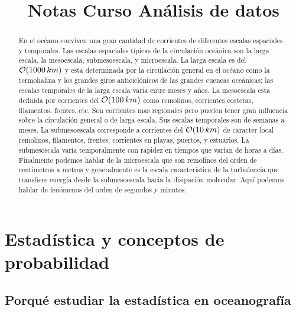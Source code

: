 \documentclass[
]{agujournal2019}
\begin{document}
\title{Notas Curso Análisis de datos}




\begin{abstract}
En el océano conviven una gran cantidad de corrientes de diferentes
escalas espaciales y temporales. Las escalas espaciales típicas de la
circulación oceánica son la larga escala, la mesoescala, submesoescala,
y microescala. La larga escala es del \({\cal O}(1000\,km)\) y esta
determinada por la circulación general en el océano como la termohalina
y los grandes giros anticiclónicos de las grandes cuencas oceánicas; las
escalas temporales de la larga escala varia entre meses y años. La
mesoescala esta definida por corrientes del \({\cal O}(100\,km)\) como
remolinos, corrientes costeras, filamentos, frentes, etc. Son corrientes
mas regionales pero pueden tener gran influencia sobre la circulación
general o de larga escala. Sus escalas temporales son de semanas a
meses. La submesoescala corresponde a corrientes del
\({\cal O}(10\,km)\) de caracter local remolinos, filamentos, frentes,
corrientes en playas, puertos, y estuarios. La submesoscala varía
temporalmente con rapidez en tiempos que varían de horas a días.
Finalmente podemos hablar de la microescala que son remolinos del orden
de centímetros a metros y generalmente es la escala característica de la
turbulencia que transfiere energía desde la submesoescala hacia la
disipación molecular. Aquí podemos hablar de fenómenos del orden de
segundos y minutos.
\end{abstract}






\section{Estadística y conceptos de
probabilidad}\label{estaduxedstica-y-conceptos-de-probabilidad}

\subsection{Porqué estudiar la estadística en oceanografía}
\end{document}

